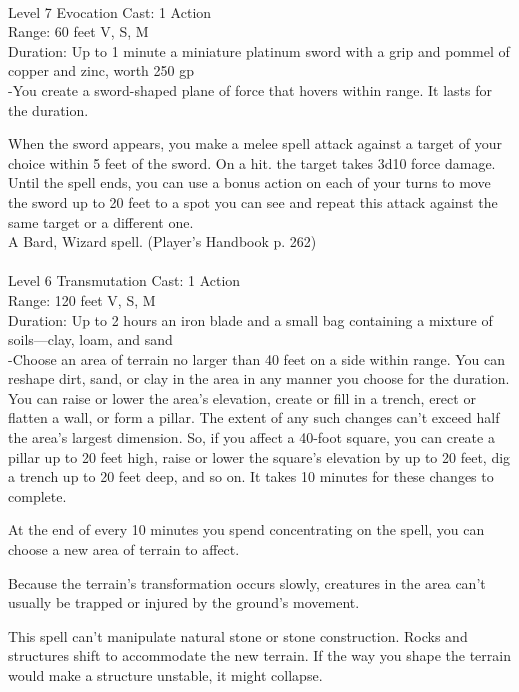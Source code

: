 \documentclass[10pt,twocolumn]{report}
\begin{document}
 \\
Level 7 \quad Evocation \quad Cast: 1 Action\\
Range: 60 feet \quad V, S, M\\
Duration: Up to 1 minute \quad a miniature platinum sword with a grip and pommel of copper and zinc, worth 250 gp\\
-You create a sword-shaped plane of force that hovers within range. It lasts for the duration.

When the sword appears, you make a melee spell attack against a target of your choice within 5 feet of the sword. On a hit. the target takes 3d10 force damage. Until the spell ends, you can use a bonus action on each of your turns to move the sword up to 20 feet to a spot you can see and repeat this attack against the same target or a different one.\\
A Bard, Wizard spell. (Player's Handbook p. 262) \\


 \\
Level 6 \quad Transmutation \quad Cast: 1 Action\\
Range: 120 feet \quad V, S, M\\
Duration: Up to 2 hours \quad an iron blade and a small bag containing a mixture of soils—clay, loam, and sand\\
-Choose an area of terrain no larger than 40 feet on a side within range. You can reshape dirt, sand, or clay in the area in any manner you choose for the duration. You can raise or lower the area’s elevation, create or fill in a trench, erect or flatten a wall, or form a pillar. The extent of any such changes can’t exceed half the area’s largest dimension. So, if you affect a 40-foot square, you can create a pillar up to 20 feet high, raise or lower the square’s elevation by up to 20 feet, dig a trench up to 20 feet deep, and so on. It takes 10 minutes for these changes to complete.

At the end of every 10 minutes you spend concentrating on the spell, you can choose a new area of terrain to affect.

Because the terrain’s transformation occurs slowly, creatures in the area can’t usually be trapped or injured by the ground’s movement.

This spell can’t manipulate natural stone or stone construction. Rocks and structures shift to accommodate the new terrain. If the way you shape the terrain would make a structure unstable, it might collapse.
\end{document}
